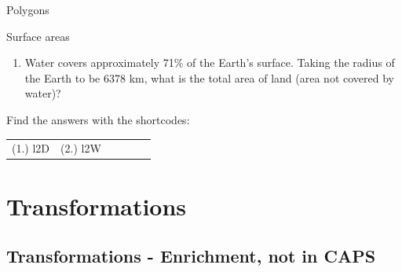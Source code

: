 \begin{exercises}{Polygons}
\begin{exercises}{Surface areas }
\begin{enumerate}[noitemsep, label=\textbf{\arabic*}. ]
\begin{figure}[H]
\begin{center}
      \vspace{2pt}
    \vspace{.1in}
    
    \end{center}

 \end{figure}   

    \addtocounter{footnote}{-0}
            \label{m39357*uid8654}\item Water covers approximately 71\% of the Earth's surface. Taking the radius of the Earth to be 6378 km, what is the total area of land (area not covered by water)?\newline
            
\end{enumerate}
        
      

      

  \label{m39357**end}
          
\par {} Find the answers with the shortcodes:
 \par \begin{tabular}[h]{cccccc}
 (1.) l2D  &  (2.) l2W  & \end{tabular}



         \section{ Transformations}
    \nopagebreak
    
    
    
    
    
    
   
  \label{m39358*cid6}
            \subsection{ Transformations - Enrichment, not in CAPS}
            \nopagebreak
            

\end{exercises}
\end{exercises}
